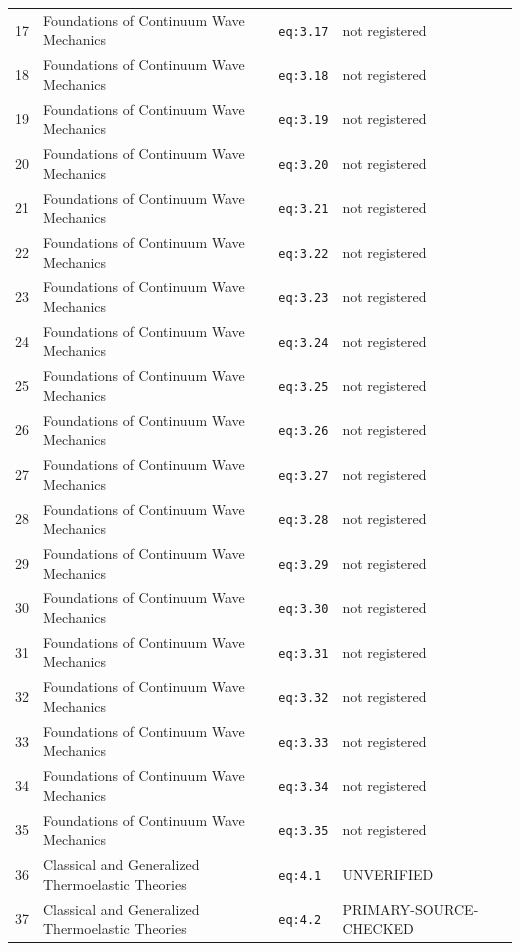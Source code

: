\begin{longtable}{@{}p{1.1cm}p{5.6cm}p{3.4cm}p{2.9cm}@{}}
17 & Foundations of Continuum Wave Mechanics & \texttt{eq:3.17} & not registered \\
18 & Foundations of Continuum Wave Mechanics & \texttt{eq:3.18} & not registered \\
19 & Foundations of Continuum Wave Mechanics & \texttt{eq:3.19} & not registered \\
20 & Foundations of Continuum Wave Mechanics & \texttt{eq:3.20} & not registered \\
21 & Foundations of Continuum Wave Mechanics & \texttt{eq:3.21} & not registered \\
22 & Foundations of Continuum Wave Mechanics & \texttt{eq:3.22} & not registered \\
23 & Foundations of Continuum Wave Mechanics & \texttt{eq:3.23} & not registered \\
24 & Foundations of Continuum Wave Mechanics & \texttt{eq:3.24} & not registered \\
25 & Foundations of Continuum Wave Mechanics & \texttt{eq:3.25} & not registered \\
26 & Foundations of Continuum Wave Mechanics & \texttt{eq:3.26} & not registered \\
27 & Foundations of Continuum Wave Mechanics & \texttt{eq:3.27} & not registered \\
28 & Foundations of Continuum Wave Mechanics & \texttt{eq:3.28} & not registered \\
29 & Foundations of Continuum Wave Mechanics & \texttt{eq:3.29} & not registered \\
30 & Foundations of Continuum Wave Mechanics & \texttt{eq:3.30} & not registered \\
31 & Foundations of Continuum Wave Mechanics & \texttt{eq:3.31} & not registered \\
32 & Foundations of Continuum Wave Mechanics & \texttt{eq:3.32} & not registered \\
33 & Foundations of Continuum Wave Mechanics & \texttt{eq:3.33} & not registered \\
34 & Foundations of Continuum Wave Mechanics & \texttt{eq:3.34} & not registered \\
35 & Foundations of Continuum Wave Mechanics & \texttt{eq:3.35} & not registered \\
36 & Classical and Generalized Thermoelastic Theories & \texttt{eq:4.1} & UNVERIFIED \\
37 & Classical and Generalized Thermoelastic Theories & \texttt{eq:4.2} & PRIMARY-SOURCE-CHECKED \\

\end{longtable}
